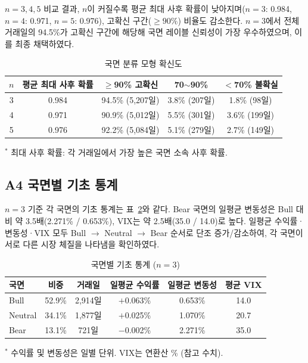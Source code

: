 \documentclass[eng]{kjas3}
\begin{document}
$n = 3, 4, 5$ 비교 결과, $n$이 커질수록 평균 최대 사후 확률이 낮아지며($n=3$: 0.984, $n=4$: 0.971, $n=5$: 0.976), 고확신 구간($\geq 90\%$) 비율도 감소한다. $n = 3$에서 전체 거래일의 94.5\%가 고확신 구간에 해당해 국면 레이블 신뢰성이 가장 우수하였으며, 이를 최종 채택하였다.

\begin{table}[t]
\centering
\caption{국면 분류 모형 확신도}
\label{tab:a1_confidence}
\begin{tabular}{ccccc}
\toprule
\textbf{$n$} & \textbf{평균 최대 사후 확률} & \textbf{$\geq$90\% 고확신} & \textbf{70$\sim$90\%} & \textbf{$<$70\% 불확실} \\
\midrule
3 & 0.984 & 94.5\% (5,207일) & 3.8\% (207일) & 1.8\% (98일) \\
4 & 0.971 & 90.9\% (5,012일) & 5.5\% (301일) & 3.6\% (199일) \\
5 & 0.976 & 92.2\% (5,084일) & 5.1\% (279일) & 2.7\% (149일) \\
\bottomrule
\end{tabular}
\begin{flushleft}
{\small $^*$ 최대 사후 확률: 각 거래일에서 가장 높은 국면 소속 사후 확률.}
\end{flushleft}
\end{table}

\subsection*{A4 국면별 기초 통계}

$n = 3$ 기준 각 국면의 기초 통계는 표~\ref{tab:a1_stats}와 같다. Bear 국면의 일평균 변동성은 Bull 대비 약 3.5배(2.271\% / 0.653\%), VIX는 약 2.5배(35.0 / 14.0)로 높다. 일평균 수익률·변동성·VIX 모두 Bull $\rightarrow$ Neutral $\rightarrow$ Bear 순서로 단조 증가/감소하여, 각 국면이 서로 다른 시장 체질을 나타냄을 확인하였다.

\begin{table}[t]
\centering
\caption{국면별 기초 통계 ($n=3$)}
\label{tab:a1_stats}
\begin{tabular}{lccccc}
\toprule
\textbf{국면} & \textbf{비중} & \textbf{거래일} & \textbf{일평균 수익률} & \textbf{일평균 변동성} & \textbf{평균 VIX} \\
\midrule
Bull    & 52.9\% & 2,914일 & $+$0.063\% & 0.653\% & 14.0 \\
Neutral & 34.1\% & 1,877일 & $+$0.025\% & 1.070\% & 20.7 \\
Bear    & 13.1\% &   721일 & $-$0.002\% & 2.271\% & 35.0 \\
\bottomrule
\end{tabular}
\begin{flushleft}
{\small $^*$ 수익률 및 변동성은 일별 단위. VIX는 연환산 \% (참고 수치).}
\end{flushleft}
\end{table}
\end{document}
